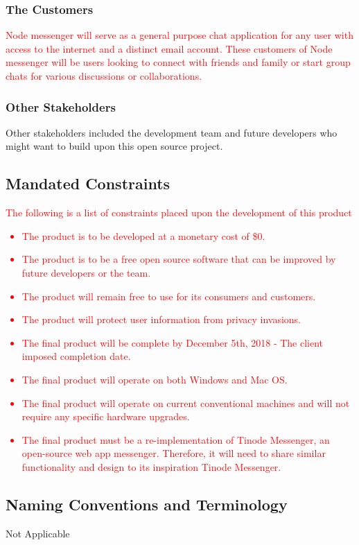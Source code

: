 \documentclass[12pt, titlepage]{article}
\begin{document}
    		\subsubsection{The Customers}
    		\textcolor{red}{Node messenger will serve as a general purpose chat application for any user with access to the internet and a distinct email account. These customers of Node messenger will be users looking to connect with friends and family or start group chats for various discussions or collaborations.}
    		\subsubsection{Other Stakeholders}
    		 Other stakeholders included the development team and future developers who might want to build upon this open source project.

    	\subsection{Mandated Constraints}
    \textcolor{red}{The following is a list of constraints placed upon the development of this product
    \begin{itemize}
    		\item The product is to be developed at a monetary cost of \$0.
    		\item The product is to be a free open source software that can be improved by future developers or the team.
    		\item The product will remain free to use for its consumers and customers.
    		\item The product will protect user information from privacy invasions.
    		\item The final product will be complete by December 5th, 2018 - The client imposed completion date.
    		\item The final product will operate on both Windows and Mac OS.
    		\item The final product will operate on current conventional machines and will not require any specific hardware upgrades.
    		\item The final product must be a re-implementation of Tinode Messenger, an open-source web app messenger. Therefore, it will need to share similar functionality and design to its inspiration Tinode Messenger.
    \end{itemize}}
    	\subsection{Naming Conventions and Terminology}
		Not Applicable
\end{document}
